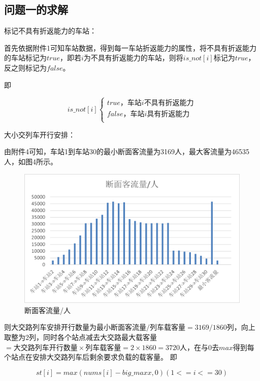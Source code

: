\documentclass[UTF8]{ctexart}
\begin{document}
\subsection{问题一的求解}
标记不具有折返能力的车站：\par
首先依据附件1可知车站数据，得到每一车站折返能力的属性，将不具有折返能力的车站标记为$true$，即若$i$为不具有折返能力的车站，则将$is\_not\left[ i \right] $标记为$true$，反之则标记为$false$。\par
即\par
$$
is\_not\left[ i \right] \left\{ \begin{array}{c}
	true\text{，车站}i\text{不具有折返能力}\\
	false\text{，车站}i\text{具有折返能力}\\
\end{array} \right. 
$$\par
大小交列车开行安排：\par
由附件4可知，车站1到车站30的最小断面客流量为3169人，最大客流量为46535人，如图4所示。
\begin{figure}[h]
	\centering
	\includegraphics[scale=0.6]{断面客流量.png}
	\caption{断面客流量/人}
\end{figure}
则大交路列车安排开行数量为$\text{最小断面客流量}/\text{列车载客量}=3169/1860\text{列}$，向上取整为2列，同时各个站点减去大交路最大载客量$=\text{大交路列车开行数量}\times \text{列车载客量}=2\times 1860=3720\text{人}$，在与0去$max$得到每个站点在安排大交路列车后剩余要求负载的载客量。
即\par
$$
st\left[ i \right] =max\left( nums\left[ i \right] -big\_maxx,0 \right) \left( 1<=i<=30 \right) 
$$\par
\end{document}
